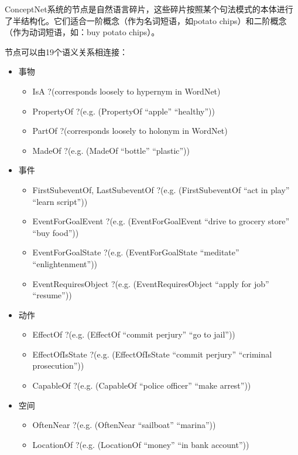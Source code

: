 ConceptNet系统的节点是自然语言碎片，这些碎片按照某个句法模式的本体进行了半结构化。它们适合一阶概念（作为名词短语，如potato chips）和二阶概念（作为动词短语，如：buy potato chips）。

节点可以由19个语义关系相连接：
\begin{itemize}

\item 事物
\begin{itemize}
\item IsA ?(corresponds loosely to hypernym in WordNet)
\item PropertyOf ?(e.g. (PropertyOf ``apple'' ``healthy''))
\item PartOf ?(corresponds loosely to holonym in WordNet)
\item MadeOf ?(e.g. (MadeOf ``bottle'' ``plastic''))
\end{itemize}

\item 事件
\begin{itemize}
\item FirstSubeventOf, LastSubeventOf ?(e.g. (FirstSubeventOf ``act in play'' ``learn script''))
\item EventForGoalEvent ?(e.g. (EventForGoalEvent ``drive to grocery store'' ``buy food''))
\item EventForGoalState ?(e.g. (EventForGoalState ``meditate'' ``enlightenment''))
\item EventRequiresObject ?(e.g. (EventRequiresObject ``apply for job'' ``resume''))
\end{itemize}

\item 动作
\begin{itemize}
\item EffectOf ?(e.g. (EffectOf ``commit perjury'' ``go to jail''))
\item EffectOfIsState ?(e.g. (EffectOfIsState ``commit perjury'' ``criminal prosecution''))
\item CapableOf ?(e.g. (CapableOf ``police officer'' ``make arrest''))
\end{itemize}

\item 空间
\begin{itemize}
\item OftenNear ?(e.g. (OftenNear ``sailboat'' ``marina''))
\item LocationOf ?(e.g. (LocationOf ``money'' ``in bank account''))
\end{itemize}


\end{itemize}
